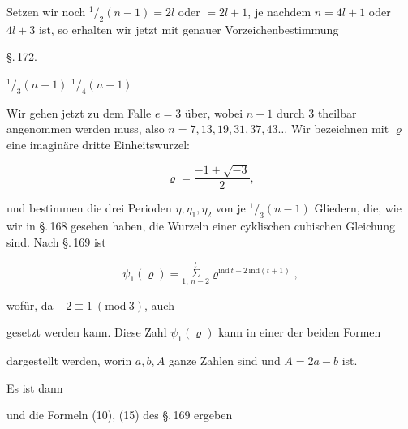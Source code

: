 
Setzen wir noch ${}^1/_2 (n - 1) = 2l$ oder $= 2l + 1$, je nachdem
$n = 4l + 1$ oder $4l + 3$ ist, so erhalten wir jetzt mit
genauer Vorzeichenbestimmung


\begin{center}
\S.\,172.
\end{center}

\begin{center}
 ${}^1/_3 (n - 1)$  ${}^1/_4 (n - 1)$ 
\end{center}

Wir gehen jetzt zu dem Falle $e = 3$ über, wobei $n - 1$
durch 3 theilbar angenommen werden muss, also $n = 7, 13, 19,
31, 37, 43 \ldots$ Wir bezeichnen mit $\varrho$ eine imaginäre dritte
Einheitswurzel:

\[ \varrho = \frac{-1 + \sqrt{-3}}{2}, \]

und bestimmen die drei Perioden $\eta, \eta_1, \eta_2$ von je ${}^1/_3 (n - 1)$
Gliedern, die, wie wir in \S.\,168 gesehen haben, die Wurzeln
einer cyklischen cubischen Gleichung sind. Nach \S.\,169 ist

\[ \psi_1(\varrho) = \overset{t}{\underset{1,\, n - 2}{\Sigma}} \varrho^{\mathrm{ind}\, t - 2\, \mathrm{ind}(t + 1)}, \]

wofür, da $-2 \equiv 1 \ (\mathrm{mod}\ 3)$, auch


gesetzt werden kann. Diese Zahl $\psi_1(\varrho)$ kann in einer der beiden
Formen


dargestellt werden, worin $a, b, A$ ganze Zahlen sind und $A = 2a - b$
ist.

Es ist dann


und die Formeln (10), (15) des \S.\,169 ergeben


